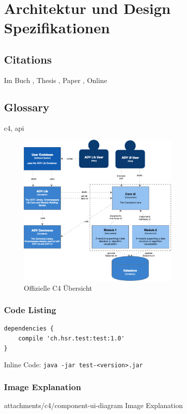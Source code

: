 \chapter{Architektur und Design Spezifikationen} \label{architecture-design-specification}

\section{Citations}
Im Buch \cite{starke}, Thesis \cite{riehle}, Paper \cite{treelayouter}, Online \cite{java-jigsaw}

\section{Glossary}
\gls{c4}, \gls{api}

\begin{figure}[H]
	\centering
	\includegraphics[width=0.7\textwidth]{attachments/c4/component-ui-diagram}
	\caption{Offizielle C4 Übersicht~\cite{c4}}
	\label{fig:c4-overview}
\end{figure}


\subsection{Code Listing}
\begin{lstlisting}[caption={Gradle}]
dependencies {
	compile 'ch.hsr.test:test:1.0'
}
\end{lstlisting}

Inline Code: \lstinline|java -jar test-<version>.jar|

\subsection{Image Explanation}
\begin{explanation}{attachments/c4/component-ui-diagram}
	Image Explanation
\end{explanation}

